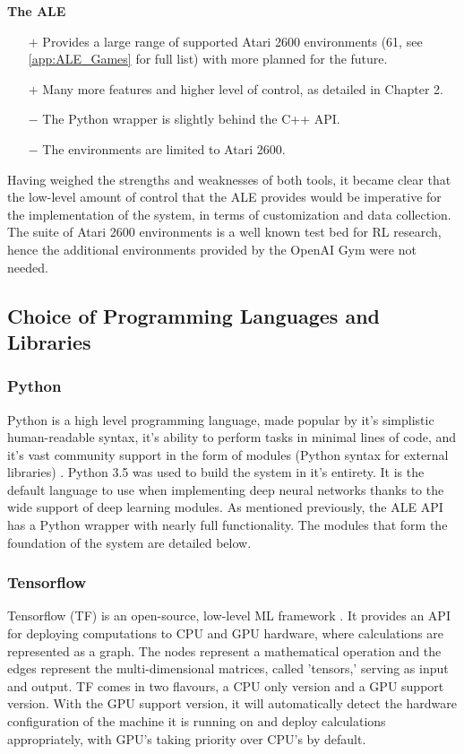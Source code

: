 \textbf{The ALE}
\begin{itemize}
    \item[$+$] Provides a large range of supported Atari 2600 environments (61, see \ref{app:ALE_Games} for full list) with more planned for the future.
    \item[$+$] Many more features and higher level of control, as detailed in Chapter 2.
    \item[$-$] The Python wrapper is slightly behind the C++ API.
    \item[$-$] The environments are limited to Atari 2600.
\end{itemize}

Having weighed the strengths and weaknesses of both tools, it became clear that the low-level amount of control that the ALE provides would be imperative for the implementation of the system, in terms of customization and data collection. The suite of Atari 2600 environments is a well known test bed for RL research, hence the additional environments provided by the OpenAI Gym were not needed.

\subsection{Choice of Programming Languages and Libraries}
\subsubsection{Python}
Python is a high level programming language, made popular by it's simplistic human-readable syntax, it's ability to perform tasks in minimal lines of code, and it's vast community support in the form of modules (Python syntax for external libraries) \cite{python}. Python 3.5 was used to build the system in it's entirety. It is the default language to use when implementing deep neural networks thanks to the wide support of deep learning modules. As mentioned previously, the ALE API has a Python wrapper with nearly full functionality. The modules that form the foundation of the system are detailed below.

\subsubsection{Tensorflow}
Tensorflow (TF) is an open-source, low-level ML framework \cite{tf}. It provides an API for deploying computations to CPU and GPU hardware, where calculations are represented as a graph. The nodes represent a mathematical operation and the edges represent the multi-dimensional matrices, called 'tensors,' serving as input and output. TF comes in two flavours, a CPU only version and a GPU support version. With the GPU support version, it will automatically detect the hardware configuration of the machine it is running on and deploy calculations appropriately, with GPU's taking priority over CPU's by default.

